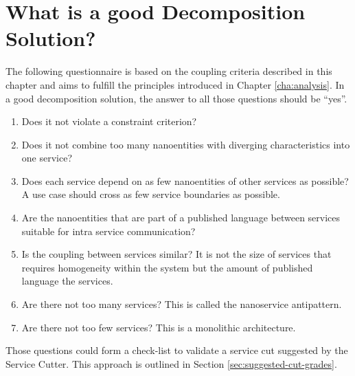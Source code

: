 




\section{What is a good Decomposition Solution?}
\label{sec:decompositionRequirements}

The following questionnaire is based on the coupling criteria described in this chapter and aims to fulfill the principles introduced in Chapter \ref{cha:analysis}. In a good decomposition solution, the answer to all those questions should be \enquote{yes}.

\begin{enumerate} %
	\item Does it not violate a constraint criterion?
	\item Does it not combine too many nanoentities with diverging characteristics into one service?
	\item Does each service depend on as few nanoentities of other services as possible? A use case should cross as few service boundaries as possible. %
	\item Are the nanoentities that are part of a published language between services suitable for intra service communication?
	\item Is the coupling between services similar? It is not the size of services that requires homogeneity within the system but the amount of published language the services. 
	\item Are there not too many services? This is called the nanoservice antipattern\cite{nanoservice}.
	\item Are there not too few services? This is a monolithic architecture.
\end{enumerate}

Those questions could form a check-list to validate a service cut suggested by the Service Cutter. This approach is outlined in Section \ref{sec:suggested-cut-grades}.




